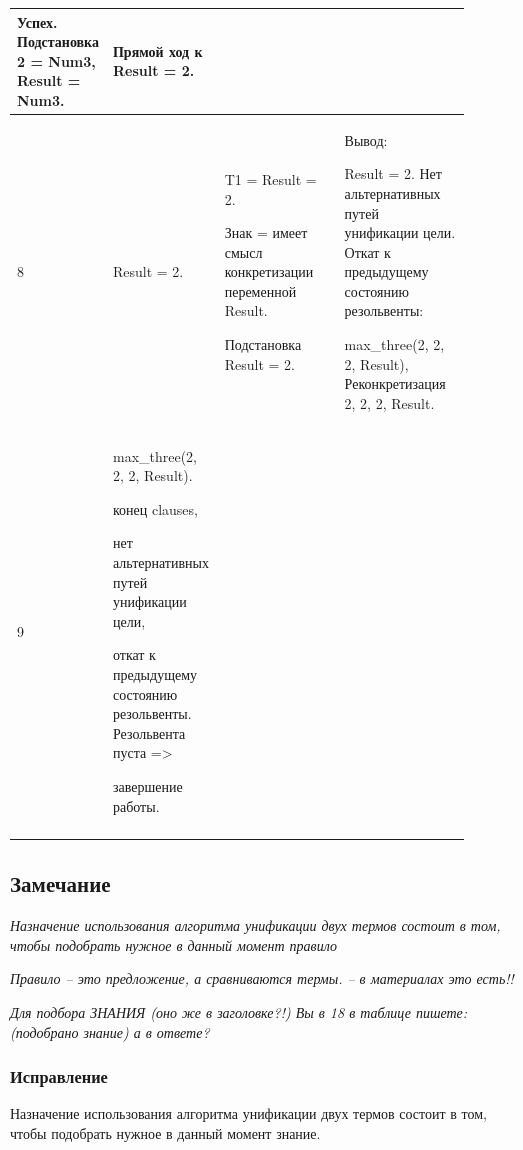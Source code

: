 \documentclass[a4paper,12pt]{article}
\begin{document}
\begin{center}
\begin{longtable}[h!]{|p{0.05\linewidth}|p{0.25\linewidth}|p{ 0.3\linewidth}|p{ 0.3\linewidth}|}
{				Успех. Подстановка 2 = Num3, Result = Num3.} & {Прямой ход к Result = 2.}\\
			
			\hline
			
			{8} & {Result = 2.} & {T1 = Result = 2.
				
				Знак = имеет смысл конкретизации переменной Result.
				
				Подстановка Result = 2.} & {Вывод:
				
				
				
				Result = 2. Нет альтернативных путей унификации цели. Откат к предыдущему состоянию резольвенты:
				
				max\_three(2, 2, 2, Result), Реконкретизация 2, 2, 2, Result.}\\
			
			\hline
			
			{9} & {max\_three(2, 2, 2, Result).
				
				
				
				конец clauses,
				
				нет альтернативных путей унификации цели,
				
				откат к предыдущему состоянию резольвенты. Резольвента пуста =>
				
				завершение работы.} & {} & {}\\
			
			\hline
			\label{m1}
		\end{longtable}
	\end{center}

	\subsection*{Замечание}
	
	\textit{Назначение использования алгоритма унификации двух термов состоит в том, чтобы подобрать нужное в данный момент правило}
	
	\textit{Правило – это предложение, а сравниваются термы. – в материалах это есть!!}
	
	\textit{Для подбора ЗНАНИЯ (оно же в заголовке?!)  Вы в 18 в таблице пишете: (подобрано знание) а в ответе?}

	\subsubsection*{Исправление}
	
	Назначение использования алгоритма унификации двух термов состоит в том, чтобы подобрать нужное в данный момент знание.
	
\end{document}
